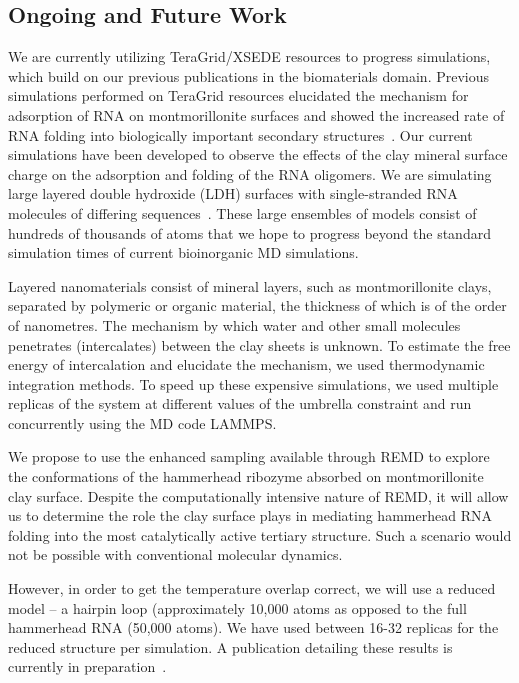 \documentclass[a4paper,11pt]{article}
\begin{document}
\subsection{Ongoing and Future Work}
We are currently utilizing TeraGrid/XSEDE resources to progress simulations, which build on our previous publications in the biomaterials domain. Previous simulations performed on TeraGrid resources elucidated the mechanism for adsorption of RNA on montmorillonite surfaces and showed the increased rate of RNA folding into biologically important secondary structures~\cite{Ref9}. Our current simulations have been developed to observe the effects of the clay mineral surface charge on the adsorption and folding of the RNA oligomers. We are simulating large layered double hydroxide (LDH) surfaces with single-stranded RNA molecules of differing sequences~\cite{Ref10}. These large ensembles of models consist of hundreds of thousands of atoms that we hope to progress beyond the standard simulation times of current bioinorganic MD simulations.

Layered nanomaterials consist of mineral layers, such as montmorillonite clays, separated by polymeric or organic material, the thickness of which is of the order of nanometres. The mechanism by which water and other small molecules penetrates (intercalates) between the clay sheets is unknown. To estimate the free energy of intercalation and elucidate the mechanism, we used thermodynamic integration methods. To speed up these expensive simulations, we used multiple replicas of the system at different values of the umbrella constraint and run concurrently using the MD code LAMMPS. 

We propose to use the enhanced sampling available through REMD to explore the conformations of the hammerhead ribozyme absorbed on montmorillonite clay surface. Despite the computationally intensive nature of REMD, it will allow us to determine the role the clay surface plays in mediating hammerhead RNA folding into the most catalytically active tertiary structure. Such a scenario would not be possible with conventional molecular dynamics.

However, in order to get the temperature overlap correct, we will use a reduced model -- a hairpin loop (approximately 10,000 atoms as opposed to the full hammerhead RNA (50,000 atoms).  We have used between 16-32 replicas for the reduced structure per simulation. %
A publication detailing these results is currently in preparation~\cite{Ref11}.
\end{document}

